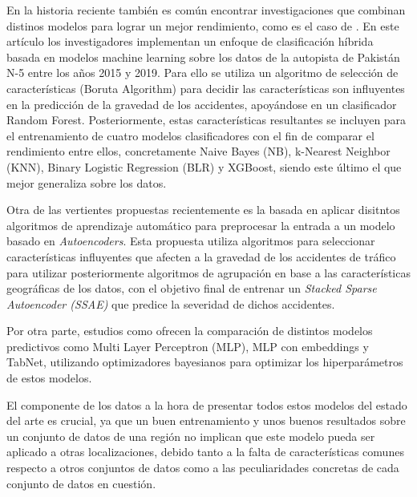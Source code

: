 \documentclass{uathesis-es}
\begin{document}
En la historia reciente también es común encontrar investigaciones que combinan distinos modelos para lograr un mejor rendimiento, como es el caso de \cite{zhang2022hybrid}. En este artículo los investigadores implementan un enfoque de clasificación híbrida basada en modelos machine learning sobre los datos de la autopista de Pakistán N-5 entre los años 2015 y 2019. Para ello se utiliza un algoritmo de selección de características (Boruta Algorithm) para decidir las características son influyentes en la predicción de la gravedad de los accidentes, apoyándose en un clasificador Random Forest. Posteriormente, estas características resultantes se incluyen para el entrenamiento de cuatro modelos clasificadores con el fin de comparar el rendimiento entre ellos, concretamente Naive Bayes (NB), k-Nearest Neighbor (KNN), Binary Logistic Regression (BLR) y XGBoost, siendo este último el que mejor generaliza sobre los datos.





Otra de las vertientes propuestas recientemente es la basada en aplicar disitntos algoritmos de aprendizaje automático para preprocesar la entrada a un modelo basado en \textit{Autoencoders}. Esta propuesta utiliza algoritmos para seleccionar características influyentes que afecten a la gravedad de los accidentes de tráfico para utilizar posteriormente algoritmos de agrupación en base a las características geográficas de los datos, con el objetivo final de entrenar un \textit{Stacked Sparse Autoencoder (SSAE)} \cite{ma2021analytic} que predice la severidad de dichos accidentes.

Por otra parte, estudios como \cite{Sattar2023} ofrecen la comparación de distintos modelos predictivos como Multi Layer Perceptron (MLP), MLP con embeddings y TabNet, utilizando optimizadores bayesianos para optimizar los hiperparámetros de estos modelos.

El componente de los datos a la hora de presentar todos estos modelos del estado del arte es crucial, ya que un buen entrenamiento y unos buenos resultados sobre un conjunto de datos de una región no implican que este modelo pueda ser aplicado a otras localizaciones, debido tanto a la falta de características comunes respecto a otros conjuntos de datos como a las peculiaridades concretas de cada conjunto de datos en cuestión.
\end{document}
